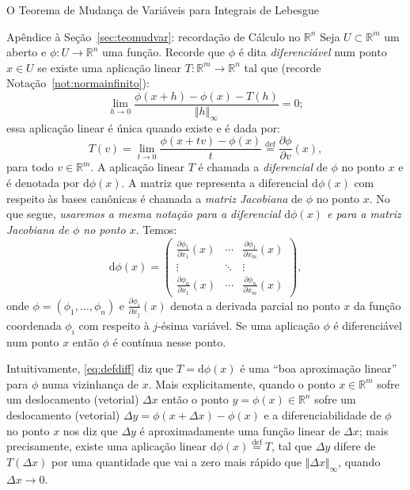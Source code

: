 \documentclass[oneside,final,11pt]{amsbook}
\newcommand{\R}{\mathds R}
\newcommand{\dd}{\mathrm d}
\theoremstyle{remark}\newtheorem{exercise}{Exercício}[chapter]
\theoremstyle{remark}\newtheorem{*exercise}[exercise]{\hbox to 0pt{\hskip 0pt minus 1fil*}Exercício}
\theoremstyle{definition}\newtheorem{exdefin}{Definição}[chapter]
\theoremstyle{plain}\newtheorem{teo}{Teorema}[section]
\theoremstyle{plain}\newtheorem{lem}[teo]{Lema}
\theoremstyle{plain}\newtheorem{prop}[teo]{Proposição}
\theoremstyle{plain}\newtheorem{cor}[teo]{Corolário}
\theoremstyle{definition}\newtheorem{defin}[teo]{Definição}
\theoremstyle{remark}\newtheorem{rem}[teo]{Observação}
\theoremstyle{definition}\newtheorem{notation}[teo]{Notação}
\theoremstyle{definition}\newtheorem{convention}[teo]{Convenção}
\theoremstyle{definition}\newtheorem{example}[teo]{Exemplo}
\numberwithin{section}{chapter}
\numberwithin{equation}{section}
\begin{document}
\begin{chapter}{O Teorema de Mudança de Variáveis para Integrais de Lebesgue}
\begin{section}[recordação de Cálculo no $\R^n$]{Apêndice à Seção~\ref{sec:teomudvar}: recordação de Cálculo no ${\R^n}$}
Seja $U\subset\R^m$ um aberto e $\phi:U\to\R^n$ uma função. Recorde que $\phi$ é dita
{\em diferenciável\/}
num ponto $x\in U$ se existe uma aplicação linear $T:\R^m\to\R^n$ tal que (recorde Notação~\ref{not:normainfinito}):
\begin{equation}\label{eq:defdiff}
\lim_{h\to0}\frac{\phi(x+h)-\phi(x)-T(h)}{\Vert h\Vert_\infty}=0;
\end{equation}
essa aplicação linear é única quando existe e é dada por:
\[T(v)=\lim_{t\to0}\frac{\phi(x+tv)-\phi(x)}t\stackrel{\text{def}}=\frac{\partial\phi}{\partial v}(x),\]
para todo $v\in\R^m$. A aplicação linear $T$ é chamada a
{\em diferencial\/}
de $\phi$ no ponto $x$ e é denotada por $\dd\phi(x)$\index[simbolos]{$\dd\phi(x)$}. A matriz que representa
a diferencial $\dd\phi(x)$ com respeito às bases canônicas é chamada a
{\em matriz Jacobiana\/}
de $\phi$ no ponto $x$. No que segue, {\em usaremos a mesma notação para a diferencial $\dd\phi(x)$ e para a
matriz Jacobiana de $\phi$ no ponto $x$}. Temos:
\[\dd\phi(x)=\begin{pmatrix}
\frac{\partial\phi_1}{\partial x_1}(x)&\cdots&\frac{\partial\phi_1}{\partial x_m}(x)\\
\vdots&\ddots&\vdots\\
\frac{\partial\phi_n}{\partial x_1}(x)&\cdots&\frac{\partial\phi_n}{\partial x_m}(x)
\end{pmatrix},\]
onde $\phi=(\phi_1,\ldots,\phi_n)$ e $\frac{\partial\phi_i}{\partial x_j}(x)$ denota a derivada parcial
no ponto $x$ da função coordenada $\phi_i$ com respeito à $j$-ésima variável.
Se uma aplicação $\phi$ é diferenciável num ponto $x$ então $\phi$ é contínua nesse ponto.

Intuitivamente, \eqref{eq:defdiff} diz que $T=\dd\phi(x)$ é uma ``boa aproximação linear'' para $\phi$ numa vizinhança
de $x$. Mais explicitamente, quando o ponto $x\in\R^m$ sofre um deslocamento (vetorial) $\Delta x$
então o ponto $y=\phi(x)\in\R^n$ sofre um deslocamento (vetorial) $\Delta y=\phi(x+\Delta x)-\phi(x)$ e a diferenciabilidade
de $\phi$ no ponto $x$ nos diz que $\Delta y$ é aproximadamente uma função linear de $\Delta x$; mais precisamente,
existe uma aplicação linear $\dd\phi(x)\stackrel{\text{def}}=T$, tal que $\Delta y$ difere de $T(\Delta x)$
por uma quantidade que vai a zero mais rápido que $\Vert\Delta x\Vert_\infty$, quando $\Delta x\to0$.


\end{section}
\end{chapter}
\end{document}
